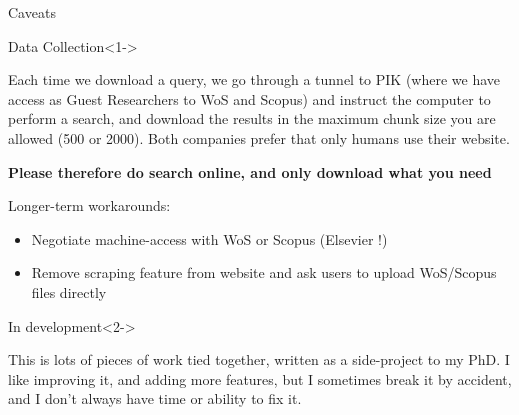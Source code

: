 \documentclass[9pt]{beamer}
\begin{document}
\begin{frame}{Caveats}

\begin{block}{Data Collection}<1->

Each time we download a query, we go through a tunnel to PIK (where we have access as Guest Researchers to WoS and Scopus) and instruct the computer to perform a search, and download the results in the maximum chunk size you are allowed (500 or 2000). Both companies prefer that only humans use their website.

\medskip

\textbf{Please therefore do search online, and only download what you need}
\medskip

Longer-term workarounds:
\begin{itemize}
	\item Negotiate machine-access with WoS or Scopus (Elsevier !)
	\item Remove scraping feature from website and ask users to upload WoS/Scopus files directly
\end{itemize}

\end{block}

\begin{block}{In development}<2->
	
	This is lots of pieces of work tied together, written as a side-project to my PhD. I like improving it, and adding more features, but I sometimes break it by accident, and I don't always have time or ability to fix it.
	
\end{block}


\end{frame}

\end{document}
